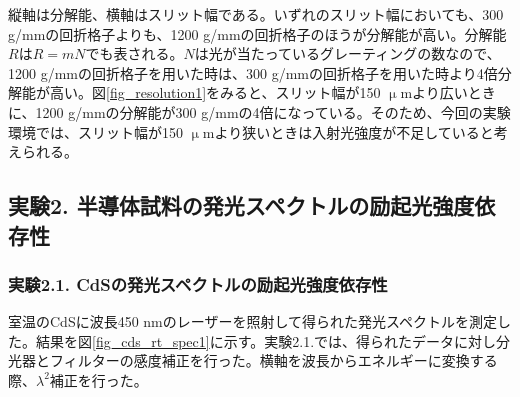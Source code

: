 \documentclass[11pt,a4j]{jsarticle}
\begin{document}
\begin{enumerate}
       縦軸は分解能、横軸はスリット幅である。いずれのスリット幅においても、300 g/mmの回折格子よりも、1200 g/mmの回折格子のほうが分解能が高い。分解能$R$は$R=mN$でも表される。$N$は光が当たっているグレーティングの数なので、1200 g/mmの回折格子を用いた時は、300 g/mmの回折格子を用いた時より4倍分解能が高い。図\ref{fig_resolution1}をみると、スリット幅が150 $\upmu$mより広いときに、1200 g/mmの分解能が300 g/mmの4倍になっている。そのため、今回の実験環境では、スリット幅が150 $\upmu$mより狭いときは入射光強度が不足していると考えられる。%

\end{enumerate}%

\newpage

\subsection{実験2. 半導体試料の発光スペクトルの励起光強度依存性}
\subsubsection{実験2.1. CdSの発光スペクトルの励起光強度依存性}

室温のCdSに波長450 nmのレーザーを照射して得られた発光スペクトルを測定した。結果を図\ref{fig_cds_rt_spec1}に示す。実験2.1.では、得られたデータに対し分光器とフィルターの感度補正を行った。横軸を波長からエネルギーに変換する際、$\lambda^2$補正を行った。
\end{document}

